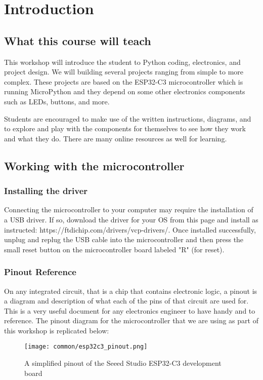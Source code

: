 \chapter{Introduction}
\section{What this course will teach}
This workshop will introduce the student to Python coding, electronics, and project
design. We will building several projects ranging from simple to more complex. These
projects are based on the ESP32-C3 microcontroller which is running MicroPython and
they depend on some other electronics components such as LEDs, buttons, and more.

Students are encouraged to make use of the written instructions, diagrams, and to
explore and play with the components for themselves to see how they work and what
they do. There are many online resources as well for learning.

\section{Working with the microcontroller}
\subsection{Installing the driver}
Connecting the microcontroller to your computer may require the installation of a
USB driver. If so, download the driver for your OS from this page and install as instructed:
https://ftdichip.com/drivers/vcp-drivers/. Once installed successfully, unplug and replug
the USB cable into the microcontroller and then press the small reset button on the
microcontroller board labeled "R" (for reset).

\subsection{Pinout Reference} \label{pinout}
On any integrated circuit, that is a chip that contains electronic logic, a pinout is
a diagram and description of what each of the pins of that circuit are used for. This is
a very useful document for any electronics engineer to have handy and to reference. The
pinout diagram for the microcontroller that we are using as part of this workshop is
replicated below:
\begin{figure}[H]
\centering
    \texttt{[image: common/esp32c3\_pinout.png]}
    \caption{A simplified pinout of the Seeed Studio ESP32-C3 development board}
\end{figure}

